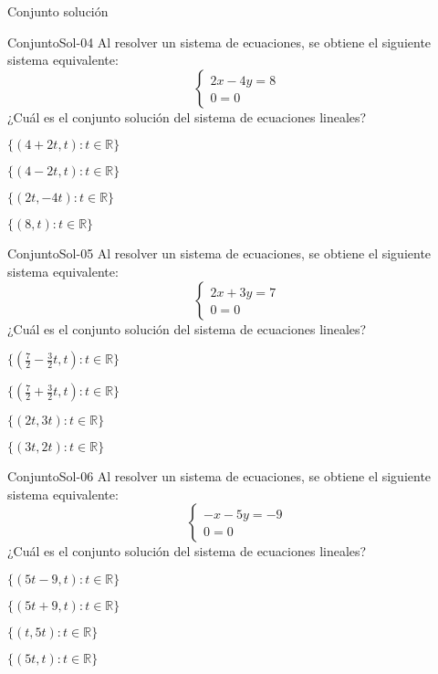 \documentclass[a4,11pt]{aleph-notas}
\begin{document}
\begin{quiz}{Conjunto solución}
\begin{multi}[]%
    {ConjuntoSol-04}
    Al resolver un sistema de ecuaciones, se obtiene el siguiente sistema equivalente:
    \[
        \begin{cases}
            2x - 4y = 8 \\
            0 = 0
        \end{cases}
    \]
    ¿Cuál es el conjunto solución del sistema de ecuaciones lineales?
    \item* $\{(4+2t, t) : t\in \mathbb{R}\}$
    \item $\{(4-2t, t) : t\in \mathbb{R}\}$
    \item $\{(2t, -4t) : t\in \mathbb{R}\}$
    \item $\{(8, t) : t\in \mathbb{R}\}$
\end{multi}

\begin{multi}[]%
    {ConjuntoSol-05}
    Al resolver un sistema de ecuaciones, se obtiene el siguiente sistema equivalente:
    \[
        \begin{cases}
            2x + 3y = 7 \\
            0 = 0
        \end{cases}
    \]
    ¿Cuál es el conjunto solución del sistema de ecuaciones lineales?
    \item* $\{\left(\frac{7}{2}-\frac{3}{2}t, t\right) : t\in \mathbb{R}\}$
    \item $\{\left(\frac{7}{2}+\frac{3}{2}t, t\right) : t\in \mathbb{R}\}$
    \item $\{\left(2t,3t\right) : t\in \mathbb{R}\}$
    \item $\{\left(3t, 2t\right) : t\in \mathbb{R}\}$
\end{multi}

\begin{multi}[]%
    {ConjuntoSol-06}
    Al resolver un sistema de ecuaciones, se obtiene el siguiente sistema equivalente:
    \[
        \begin{cases}
            -x - 5y = -9 \\
            0 = 0
        \end{cases}
    \]
    ¿Cuál es el conjunto solución del sistema de ecuaciones lineales?
    \item* $\{(5t-9, t) : t\in \mathbb{R}\}$
    \item $\{(5t+9, t) : t\in \mathbb{R}\}$
    \item $\{(t,5t) : t\in \mathbb{R}\}$
    \item $\{(5t,t) : t\in \mathbb{R}\}$
\end{multi}


\end{quiz}
\end{document}
